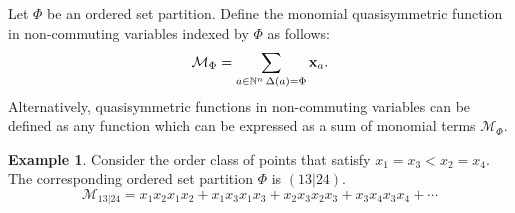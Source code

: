 \documentclass[12pt,reqno]{amsart}
\numberwithin{definition}{section}
\theoremstyle{definition}
\newtheorem{example}[definition]{Example}
\newcommand{\ncM}{\mathcal{M}}
\begin{document}
Let $\Phi$ be an ordered set partition.  Define the monomial quasisymmetric function in non-commuting variables indexed by $\Phi$ as follows:
$$\ncM_{\Phi} = \sum_{a \in \mathbb{N}^n \, \Delta(a) = \Phi} {\bf{x}}_{a}.$$
Alternatively, quasisymmetric functions in non-commuting variables can be defined as any function which can be expressed as a sum of monomial terms $\ncM_{\Phi}$.

\begin{example}
Consider the order class of points that satisfy $x_1 = x_3 < x_2 =
x_4$.  The corresponding ordered set partition $\Phi$ is $(13|24)$.
$$\ncM_{13|24} = x_1x_2x_1x_2 + x_1x_3x_1x_3 + x_2x_3x_2x_3 + x_3x_4x_3x_4 + \cdots$$  
\end{example}




\begin{figure}[h]

\end{figure}
\end{document}
